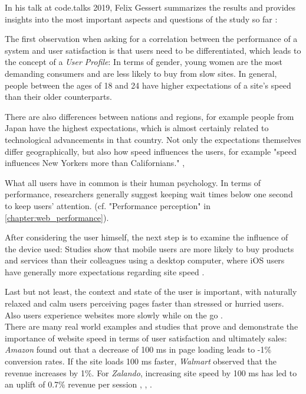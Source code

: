 In his talk at code.talks 2019, Felix Gessert summarizes the results and provides insights into the most important aspects and questions of the study so far \cite{2019Gessert}:

The first observation when asking for a correlation between the performance of a system and user satisfaction is that users need to be differentiated, which leads to the concept of a \textit{User Profile}: In terms of gender, young women are the most demanding consumers and are less likely to buy from slow sites.
In general, people between the ages of 18 and 24 have higher expectations of a site's speed than their older counterparts.

There are also differences between nations and regions, for example people from Japan have the highest expectations, which is almost certainly related to technological advancements in that country.
Not only the expectations themselves differ geographically, but also how speed influences the users, for example "speed influences New Yorkers more than Californians." \cite{2019Thinkfast}, \cite{2017Brainfood}

What all users have in common is their human psychology. 
In terms of performance, researchers generally suggest keeping wait times below one second to keep users' attention. (cf. "Performance perception" in \ref{chapter:web_performance}). 

After considering the user himself, the next step is to examine the influence of the device used: Studies show that mobile users are more likely to buy products and services than their colleagues using a desktop computer, where iOS users have generally more expectations regarding site speed \cite{2019Deviceatlas}.
 
Last but not least, the context and state of the user is important, with naturally relaxed and calm users perceiving pages faster than stressed or hurried users.
Also users experience websites more slowly while on the go \cite{2014Akamai}.
\\

There are many real world examples and studies that prove and demonstrate the importance of website speed in terms of user satisfaction and ultimately sales:
\textit{Amazon} found out that a decrease of 100 ms in page loading leads to -1\% conversion rates.
If the site loads 100 ms faster, \textit{Walmart} observed that the revenue increases by 1\%.
For \textit{Zalando}, increasing site speed by 100 ms has led to an uplift of 0.7\% revenue per session \cite{2006Linden}, \cite{2018Zalando}, \cite{2012Walmart}.


